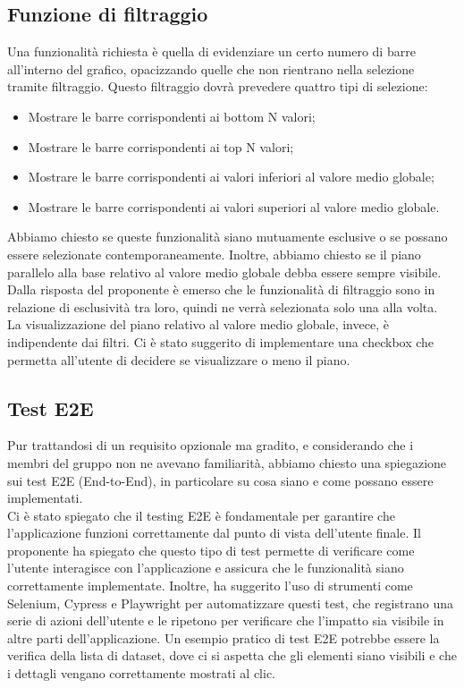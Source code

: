 \subsection{Funzione di filtraggio}
Una funzionalità richiesta è quella di evidenziare un certo numero di barre all'interno del grafico, opacizzando quelle che non rientrano nella selezione tramite filtraggio. Questo filtraggio dovrà prevedere quattro tipi di selezione:

\begin{itemize} 
    \item Mostrare le barre corrispondenti ai bottom N valori;
    \item Mostrare le barre corrispondenti ai top N valori;
    \item Mostrare le barre corrispondenti ai valori inferiori al valore medio globale;
    \item Mostrare le barre corrispondenti ai valori superiori al valore medio globale. 
\end{itemize}
Abbiamo chiesto se queste funzionalità siano mutuamente esclusive o se possano essere selezionate contemporaneamente. Inoltre, abbiamo chiesto se il piano parallelo alla base relativo al valore medio globale debba essere sempre visibile.\\
Dalla risposta del proponente è emerso che le funzionalità di filtraggio sono in relazione di esclusività tra loro, quindi ne verrà selezionata solo una alla volta.\\ La visualizzazione del piano relativo al valore medio globale, invece, è indipendente dai filtri. Ci è stato suggerito di implementare una checkbox che permetta all'utente di decidere se visualizzare o meno il piano.
\subsection{Test E2E}
Pur trattandosi di un requisito opzionale ma gradito, e considerando che i membri del gruppo non ne avevano familiarità, abbiamo chiesto una spiegazione sui test E2E (End-to-End), in particolare su cosa siano e come possano essere implementati.\\
Ci è stato spiegato che il testing E2E è fondamentale per garantire che l'applicazione funzioni correttamente dal punto di vista dell'utente finale. Il proponente ha spiegato che questo tipo di test permette di verificare come l'utente interagisce con l'applicazione e assicura che le funzionalità siano correttamente implementate. Inoltre, ha suggerito l'uso di strumenti come Selenium, Cypress e Playwright per automatizzare questi test, che registrano una serie di azioni dell'utente e le ripetono per verificare che l'impatto sia visibile in altre parti dell'applicazione. Un esempio pratico di test E2E potrebbe essere la verifica della lista di dataset, dove ci si aspetta che gli elementi siano visibili e che i dettagli vengano correttamente mostrati al clic.
